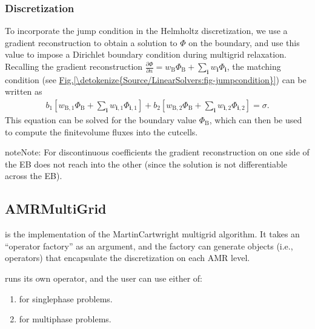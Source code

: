 \documentclass[letterpaper,10pt,english]{sphinxmanual}
\begin{document}
\subsubsection{Discretization}
\label{\detokenize{Source/LinearSolvers:discretization}}
\sphinxAtStartPar
To incorporate the jump condition in the Helmholtz discretization, we use a gradient reconstruction to obtain a solution to \(\Phi\) on the boundary, and use this value to impose a Dirichlet boundary condition during multigrid relaxation.
Recalling the gradient reconstruction \(\frac{\partial\Phi}{\partial n} = w_{\textrm{B}}\Phi_{\textrm{B}} + \sum_{\mathbf{i}} w_{\mathbf{i}}\Phi_{\mathbf{i}}\), the matching condition (see \hyperref[\detokenize{Source/LinearSolvers:fig-jumpcondition}]{Fig.\@ \ref{\detokenize{Source/LinearSolvers:fig-jumpcondition}}}) can be written as
\begin{equation*}
\begin{split}b_1\left[w_{\textrm{B},1}\Phi_{\textrm{B}} + \sum_{\mathbf{i}} w_{\mathbf{i},1}\Phi_{\mathbf{i},1}\right] + b_2\left[w_{\textrm{B},2}\Phi_{\textrm{B}} + \sum_{\mathbf{i}} w_{\mathbf{i},2}\Phi_{\mathbf{i},2}\right] = \sigma.\end{split}
\end{equation*}
\sphinxAtStartPar
This equation can be solved for the boundary value \(\Phi_{\textrm{B}}\), which can then be used to compute the finite\sphinxhyphen{}volume fluxes into the cut\sphinxhyphen{}cells.

\begin{sphinxadmonition}{note}{Note:}
\sphinxAtStartPar
For discontinuous coefficients the gradient reconstruction on one side of the EB does not reach into the other (since the solution is not differentiable across the EB).
\end{sphinxadmonition}


\subsection{AMRMultiGrid}
\label{\detokenize{Source/LinearSolvers:amrmultigrid}}
\sphinxAtStartPar
{} is the  implementation of the Martin\sphinxhyphen{}Cartwright multigrid algorithm.
It takes an “operator factory” as an argument, and the factory can generate objects (i.e., operators) that encapsulate the discretization on each AMR level.

\sphinxAtStartPar
{} runs its own operator, and the user can use either of:
\begin{enumerate}
%
\item {} 
\sphinxAtStartPar
{} for single\sphinxhyphen{}phase problems.

\item {} 
\sphinxAtStartPar
{} for multi\sphinxhyphen{}phase problems.

\end{enumerate}
\end{document}
